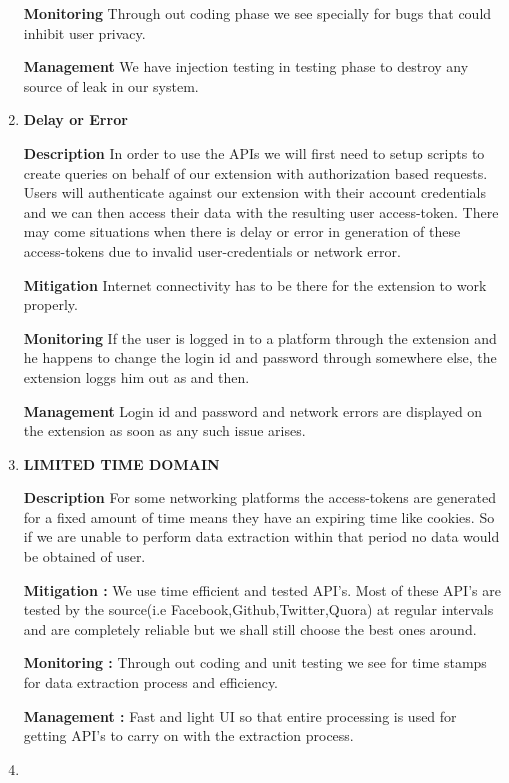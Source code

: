 \documentclass[12pt]{article}
\begin{document}
\begin{enumerate}
\bigskip
\textbf{Monitoring}
Through out coding phase we see specially for bugs that could inhibit user privacy. 

\bigskip
\textbf{Management}
We have injection testing in testing phase to destroy any source of leak in our system.
\item

\bigskip
\textbf{Delay or Error}

\bigskip
\textbf{Description}
In order to use the APIs we will first need to setup scripts to create queries on behalf of our extension with authorization based requests. Users will authenticate against our extension with their account credentials and we can then access their data with the resulting user access-token. There may come situations when there is delay or error in generation of these access-tokens due to invalid user-credentials or network error.

\bigskip
\textbf{Mitigation}
Internet connectivity has to be there for the extension to work properly.

\bigskip
\textbf{Monitoring}
If the user is logged in to a platform through the extension and he happens to change the login id and password through somewhere else, the extension loggs him out as and then.

\bigskip
\textbf{Management}
Login id and password and network errors are displayed on the extension as soon as any such issue arises.



\item
\textbf{LIMITED TIME DOMAIN}

\bigskip
\textbf{Description}
For some networking platforms the access-tokens are generated for a fixed amount of time means they have an expiring time like cookies. So if we are unable to perform data extraction within that period no data would be obtained of user.

\bigskip
\textbf{Mitigation :}
We use time efficient and tested API's. Most of these API's are tested by the source(i.e Facebook,Github,Twitter,Quora) at regular intervals and are completely reliable but we shall still choose the best ones around.

\bigskip
\textbf{Monitoring :}
Through out coding and unit testing we see for time stamps for data extraction process and  efficiency. 

\bigskip
\textbf{Management :}
Fast and light UI so that entire processing is used for getting API's to carry on with the extraction process.
\item
\bigskip


\end{enumerate}
\end{document}

